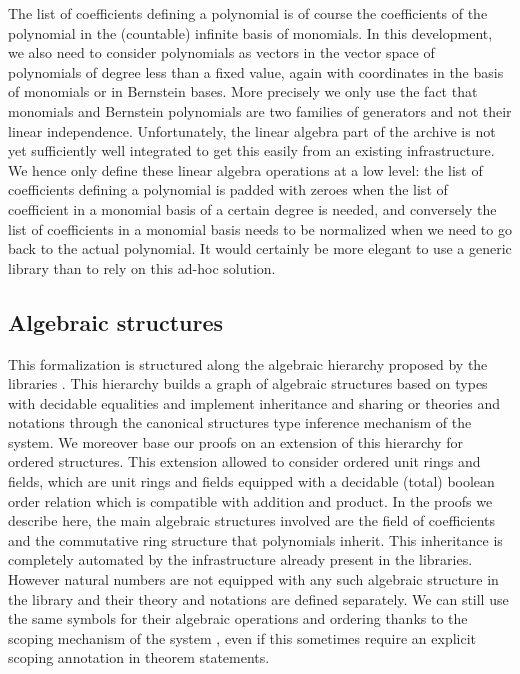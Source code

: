\documentclass{mscs}
\begin{document}
The list of coefficients defining a polynomial is of course the
coefficients of the polynomial in the (countable) infinite basis of
monomials. In this development, we also need to consider polynomials
as vectors in the vector space of polynomials of degree less than a
fixed value, again with coordinates in the basis of monomials or in
Bernstein bases. More precisely we only use the fact that monomials
and Bernstein polynomials are two families of generators and not their
linear independence. Unfortunately, the linear algebra part of the
\ssr{} archive is not yet sufficiently well integrated to get this
easily from an existing infrastructure. We hence only define these
linear algebra operations at a low level: the list of coefficients
defining a polynomial is padded with zeroes when the list of
coefficient in a monomial basis of a certain degree is needed, and
conversely the list of coefficients in a monomial basis needs to be
normalized when we need to go back to the actual polynomial.
It would certainly be more elegant to use a generic library than to
rely on this ad-hoc solution.

\subsection{Algebraic structures}\label{ssec:algstruct}

This formalization is structured along the algebraic hierarchy proposed
by the \ssr{} libraries \cite{hieralg}. This hierarchy builds a graph
of algebraic structures based on types with decidable equalities and
implement inheritance and sharing or theories and notations through
the canonical structures type inference mechanism of the \Coq{}
system. We moreover base our proofs on an extension of this hierarchy
for ordered structures\cite{COHEN:2010:INRIA-00545778:1}. This extension
allowed to consider ordered unit rings and fields, which are unit
rings and fields equipped with a decidable (total) boolean order
relation which is compatible with addition and product. In the proofs
we describe here, the main algebraic structures involved are the field
of coefficients and the commutative ring structure that polynomials
inherit. This inheritance is completely automated by the
infrastructure already present in the \ssr{} libraries. However
natural numbers are not equipped with any such algebraic structure in
the \ssr{} library and their theory and notations are defined
separately. We can still use the same symbols for their algebraic
operations and ordering thanks to the scoping mechanism of the \Coq{}
system \cite{coqsite}, even if this sometimes require an explicit
scoping annotation in theorem statements.
\end{document}
